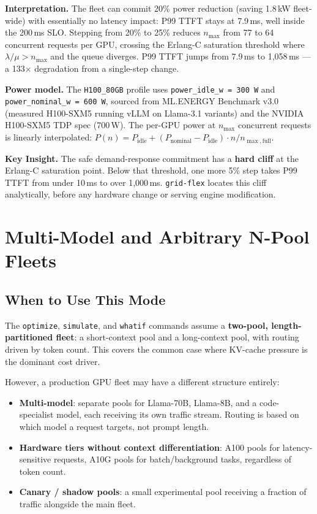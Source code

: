 \documentclass[11pt,a4paper]{article}
\newenvironment{keyinsight}
  {\begin{mdframed}[backgroundcolor=blue!5!white,linecolor=blue!60!black,linewidth=1pt]
   \textbf{Key Insight. }\ignorespaces}
  {\end{mdframed}}
\begin{document}
\textbf{Interpretation.}
The fleet can commit 20\% power reduction (saving 1.8\,kW fleet-wide)
with essentially no latency impact: P99 TTFT stays at 7.9\,ms, well
inside the 200\,ms SLO.  Stepping from 20\% to 25\% reduces $n_{\max}$
from 77 to 64 concurrent requests per GPU, crossing the Erlang-C
saturation threshold where $\lambda / \mu > n_{\max}$ and the queue
diverges.  P99 TTFT jumps from 7.9\,ms to 1,058\,ms --- a 133$\times$
degradation from a single-step change.

\textbf{Power model.}
The \texttt{H100\_80GB} profile uses \texttt{power\_idle\_w~=~300\,W}
and \texttt{power\_nominal\_w~=~600\,W}, sourced from ML.ENERGY Benchmark
v3.0~\citep{chung2025mlenergy} (measured H100-SXM5 running vLLM on Llama-3.1
variants) and the NVIDIA H100-SXM5 TDP spec (700\,W).
The per-GPU power at $n_{\max}$ concurrent requests is linearly interpolated:
$P(n) = P_{\text{idle}} + (P_{\text{nominal}} - P_{\text{idle}}) \cdot n/n_{\max,\text{full}}$.

\begin{keyinsight}
  The safe demand-response commitment has a \textbf{hard cliff} at the
  Erlang-C saturation point.  Below that threshold, one more 5\% step
  takes P99 TTFT from under 10\,ms to over 1,000\,ms.  \texttt{grid-flex}
  locates this cliff analytically, before any hardware change or serving
  engine modification.
\end{keyinsight}

\section{Multi-Model and Arbitrary N-Pool Fleets}
\label{sec:multipool}

\subsection{When to Use This Mode}

The \texttt{optimize}, \texttt{simulate}, and \texttt{whatif} commands
assume a \textbf{two-pool, length-partitioned fleet}: a short-context pool
and a long-context pool, with routing driven by token count.  This covers
the common case where KV-cache pressure is the dominant cost driver.

However, a production GPU fleet may have a different structure entirely:

\begin{itemize}[nosep]
  \item \textbf{Multi-model}: separate pools for Llama-70B, Llama-8B, and
    a code-specialist model, each receiving its own traffic stream.
    Routing is based on which model a request targets, not prompt length.
  \item \textbf{Hardware tiers without context differentiation}: A100 pools
    for latency-sensitive requests, A10G pools for batch/background tasks,
    regardless of token count.
  \item \textbf{Canary / shadow pools}: a small experimental pool receiving
    a fraction of traffic alongside the main fleet.
\end{itemize}
\end{document}
